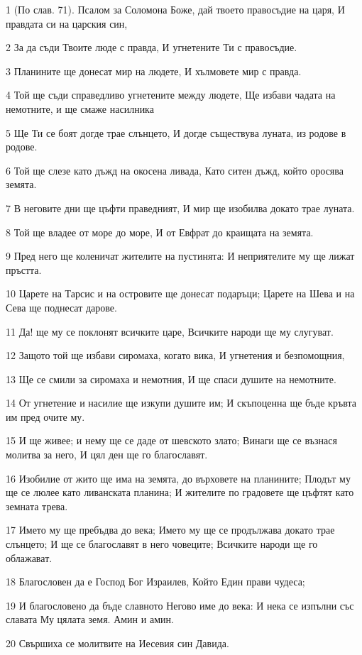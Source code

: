 \par 1 (По слав. 71). Псалом за Соломона Боже, дай твоето правосъдие на царя, И правдата си на царския син,
\par 2 За да съди Твоите люде с правда, И угнетените Ти с правосъдие.
\par 3 Планините ще донесат мир на людете, И хълмовете мир с правда.
\par 4 Той ще съди справедливо угнетените между людете, Ще избави чадата на немотните, и ще смаже насилника
\par 5 Ще Ти се боят догде трае слънцето, И догде съществува луната, из родове в родове.
\par 6 Той ще слезе като дъжд на окосена ливада, Като ситен дъжд, който оросява земята.
\par 7 В неговите дни ще цъфти праведният, И мир ще изобилва докато трае луната.
\par 8 Той ще владее от море до море, И от Евфрат до краищата на земята.
\par 9 Пред него ще коленичат жителите на пустинята: И неприятелите му ще лижат пръстта.
\par 10 Царете на Тарсис и на островите ще донесат подаръци; Царете на Шева и на Сева ще поднесат дарове.
\par 11 Да! ще му се поклонят всичките царе, Всичките народи ще му слугуват.
\par 12 Защото той ще избави сиромаха, когато вика, И угнетения и безпомощния,
\par 13 Ще се смили за сиромаха и немотния, И ще спаси душите на немотните.
\par 14 От угнетение и насилие ще изкупи душите им; И скъпоценна ще бъде кръвта им пред очите му.
\par 15 И ще живее; и нему ще се даде от шевското злато; Винаги ще се възнася молитва за него, И цял ден ще го благославят.
\par 16 Изобилие от жито ще има на земята, до върховете на планините; Плодът му ще се люлее като ливанската планина; И жителите по градовете ще цъфтят като земната трева.
\par 17 Името му ще пребъдва до века; Името му ще се продължава докато трае слънцето; И ще се благославят в него човеците; Всичките народи ще го облажават.
\par 18 Благословен да е Господ Бог Израилев, Който Един прави чудеса;
\par 19 И благословено да бъде славното Негово име до века: И нека се изпълни със славата Му цялата земя. Амин и амин.
\par 20 Свършиха се молитвите на Иесевия син Давида.

